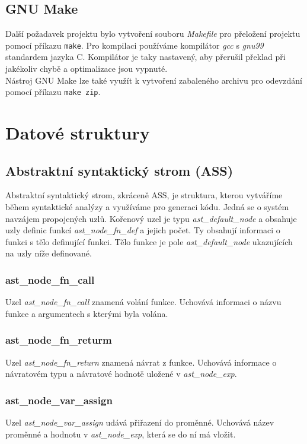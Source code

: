 \documentclass[a4paper, 12pt]{article}
\begin{document}
\subsection{GNU Make}
Další požadavek projektu bylo vytvoření souboru \textit{Makefile} pro přeložení projektu pomocí příkazu \texttt{make}. Pro kompilaci používáme kompilátor \textit{gcc} s \textit{gnu99} standardem jazyka C. Kompilátor je taky nastavený, aby přerušil překlad při jakékoliv chybě a optimalizace jsou vypnuté.\\
Nástroj GNU Make lze také využít k vytvoření zabaleného archivu pro odevzdání pomocí příkazu \texttt{make zip}.

\newpage
{}
\section{Datové struktury}

\subsection{Abstraktní syntaktický strom (ASS)}
Abstraktní syntaktický strom, zkráceně ASS, je struktura, kterou vytváříme během syntaktické analýzy a využíváme pro generaci kódu. Jedná se o systém navzájem propojených uzlů. Kořenový uzel je typu \textit{ast\_default\_node} a obsahuje uzly definic funkcí \textit{ast\_node\_fn\_def} a jejich počet. Ty obsahují informaci o funkci s tělo definující funkci. Tělo funkce je pole \textit{ast\_default\_node} ukazujících na uzly níže definované. 
\subsubsection{ast\_node\_fn\_call}
Uzel \textit{ast\_node\_fn\_call} znamená volání funkce. Uchovává informaci o názvu funkce a argumentech s kterými byla volána.
\subsubsection{ast\_node\_fn\_returm}
Uzel \textit{ast\_node\_fn\_return} znamená návrat z funkce. Uchovává informace o návratovém typu a návratové hodnotě uložené v \textit{ast\_node\_exp}.
\subsubsection{ast\_node\_var\_assign}
Uzel \textit{ast\_node\_var\_assign} udává přiřazení do proměnné. Uchovává název proměnné a hodnotu v \textit{ast\_node\_exp}, která se do ní má vložit.
\end{document}
